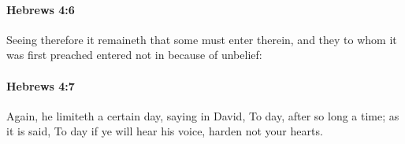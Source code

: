 		\paragraph{Hebrews 4:6} %
			\label{HEBREWS-4-6}

			Seeing therefore it remaineth that some must enter therein, and they to whom it was first preached entered not in because of unbelief:

			\begin{framed}
			\scriptsize
				\begin{compactdesc}
					\item[SBLG] 
				\end{compactdesc}
			\end{framed}

		\paragraph{Hebrews 4:7} %
			\label{HEBREWS-4-7}

			Again, he limiteth a certain day, saying in David, To day, after so long a time; as it is said, To day if ye will hear his voice, harden not your hearts.

